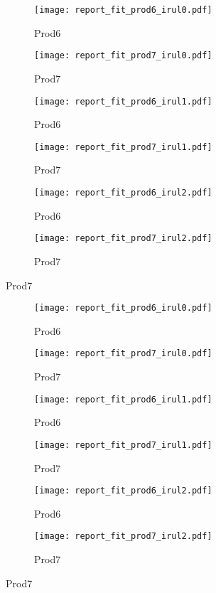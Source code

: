 \documentclass[a4paper,12pt]{article}
\begin{document}
\begin{figure}[htbp]
	\begin{subfigure}[]{0.5\textwidth}
		\centering
		\texttt{[image: report\_fit\_prod6\_irul0.pdf]} 
	    \caption{Prod6}
	\end{subfigure}%
	\hfill
	\begin{subfigure}[]{0.5\textwidth}
		\centering
		\texttt{[image: report\_fit\_prod7\_irul0.pdf]} 
	    \caption{Prod7}
	\end{subfigure}%

	\begin{subfigure}[]{0.5\textwidth}
		\centering
		\texttt{[image: report\_fit\_prod6\_irul1.pdf]} 
	    \caption{Prod6}
	\end{subfigure}%
	\hfill
	\begin{subfigure}[]{0.5\textwidth}
		\centering
		\texttt{[image: report\_fit\_prod7\_irul1.pdf]} 
	    \caption{Prod7}
	\end{subfigure}%
	
	\begin{subfigure}[]{0.5\textwidth}
		\centering
		\texttt{[image: report\_fit\_prod6\_irul2.pdf]} 
	    \caption{Prod6}
	\end{subfigure}%
	\hfill
	\begin{subfigure}[]{0.5\textwidth}
		\centering
		\texttt{[image: report\_fit\_prod7\_irul2.pdf]} 
	    \caption{Prod7}
	\end{subfigure}%
\end{figure}

\begin{figure}[htbp]
	\begin{subfigure}[]{0.5\textwidth}
		\centering
		\texttt{[image: report\_fit\_prod6\_irul0.pdf]} 
	    \caption{Prod6}
	\end{subfigure}%
	\hfill
	\begin{subfigure}[]{0.5\textwidth}
		\centering
		\texttt{[image: report\_fit\_prod7\_irul0.pdf]} 
	    \caption{Prod7}
	\end{subfigure}%

	\begin{subfigure}[]{0.5\textwidth}
		\centering
		\texttt{[image: report\_fit\_prod6\_irul1.pdf]} 
	    \caption{Prod6}
	\end{subfigure}%
	\hfill
	\begin{subfigure}[]{0.5\textwidth}
		\centering
		\texttt{[image: report\_fit\_prod7\_irul1.pdf]} 
	    \caption{Prod7}
	\end{subfigure}%
	
	\begin{subfigure}[]{0.5\textwidth}
		\centering
		\texttt{[image: report\_fit\_prod6\_irul2.pdf]} 
	    \caption{Prod6}
	\end{subfigure}%
	\hfill
	\begin{subfigure}[]{0.5\textwidth}
		\centering
		\texttt{[image: report\_fit\_prod7\_irul2.pdf]} 
	    \caption{Prod7}
	\end{subfigure}%
\end{figure}
\end{document}
